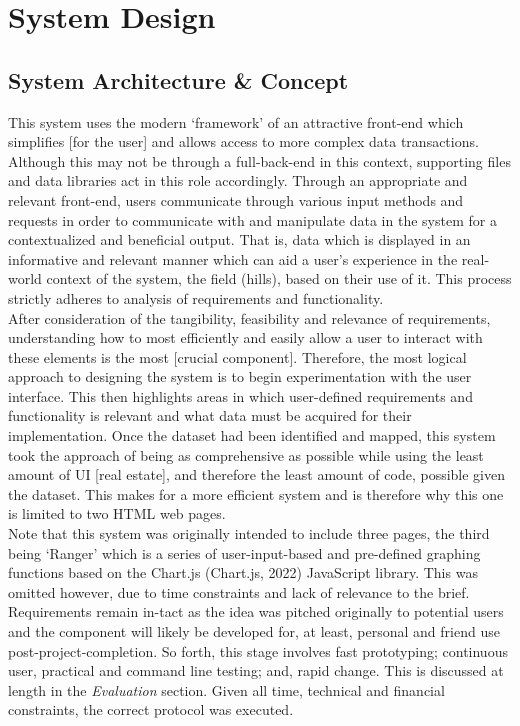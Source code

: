 \documentclass[11pt, english]{article}
\begin{document}
\newpage

\section{System Design}\label{ch5}

	\subsection{System Architecture \& Concept}

	This system uses the modern `framework' of an attractive front-end which simplifies [for the user] and allows access to more complex data transactions. Although this may not be through a full-back-end in this context, supporting files and data libraries act in this role accordingly. Through an appropriate and relevant front-end, users communicate through various input methods and requests in order to communicate with and manipulate data in the system for a contextualized and beneficial output. That is, data which is displayed in an informative and relevant manner which can aid a user's experience in the real-world context of the system, the field (hills), based on their use of it. This process strictly adheres to analysis of requirements and functionality.\\

	After consideration of the tangibility, feasibility and relevance of requirements, understanding how to most efficiently and easily allow a user to interact with these elements is the most [crucial component]. Therefore, the most logical approach to designing the system is to begin experimentation with the user interface. This then highlights areas in which user-defined requirements and functionality is relevant and what data must be acquired for their implementation. Once the dataset had been identified and mapped, this system took the approach of being as comprehensive as possible while using the least amount of UI [real estate], and therefore the least amount of code, possible given the dataset. This makes for a more efficient system and is therefore why this one is limited to two HTML web pages.\\

	Note that this system was originally intended to include three pages, the third being `Ranger' which is a series of user-input-based and pre-defined graphing functions based on the Chart.js (Chart.js, 2022) JavaScript library. This was omitted however, due to time constraints and lack of relevance to the brief. Requirements remain in-tact as the idea was pitched originally to potential users and the component will likely be developed for, at least, personal and friend use post-project-completion. So forth, this stage involves fast prototyping; continuous user, practical and command line testing; and, rapid change. This is discussed at length in the \textit{Evaluation} section. Given all time, technical and financial constraints, the correct protocol was executed.
\end{document}
